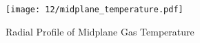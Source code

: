 \begin{figure}[h!]
    \centering
    \texttt{[image: 12/midplane\_temperature.pdf]}
    \caption{Radial Profile of Midplane Gas Temperature}
    \label{}
\end{figure}
